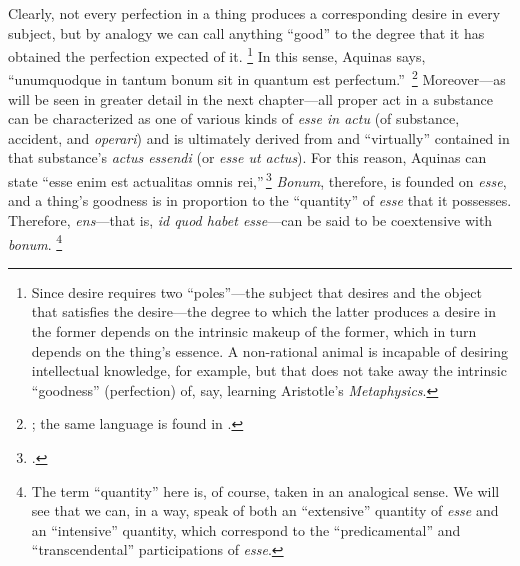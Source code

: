 %
 Clearly, not every perfection in a thing produces a corresponding desire in every subject, but by analogy we can call anything “good” to the degree that it has obtained the perfection expected of it.%
%
\footnote{Since desire requires two “poles”—the subject that desires and the object that satisfies the desire—the degree to which the latter produces a desire in the former depends on the intrinsic makeup of the former, which in turn depends on the thing’s essence. A non-rational animal is incapable of desiring intellectual knowledge, for example, but that does not take away the intrinsic “goodness” (perfection) of, say, learning Aristotle’s \emph{Metaphysics}.} In this sense, Aquinas says, “unumquodque in tantum bonum sit in quantum est perfectum.”\,%
%
\footnote{\Cite[III, cap.~24, n.~6 (Marietti n.~2051)]{st:contragent}; the same language is found in \cite[III, cap.~20, n.~2 (Marietti n.~2010)]{st:contragent}.}
%
Moreover—as will be seen in greater detail in the next chapter—all proper act in a substance can be characterized as one of various kinds of \emph{esse in actu} (of substance, accident, and \emph{operari}) and is ultimately derived from and “virtually” contained in that substance’s \emph{actus essendi} (or \emph{esse ut actus}). For this reason, Aquinas can state “esse enim est actualitas omnis rei,”\,\footcite[I, q.~5, a.~1, co.]{st:summa} \emph{Bonum}, therefore, is founded on \emph{esse}, and a thing’s goodness is in proportion to the “quantity” of \emph{esse} that it possesses.
Therefore, \emph{ens}—that is, \emph{id quod habet esse}—can be said to be coextensive with \emph{bonum}.%
%
\footnote{The term “quantity” here is, of course, taken in an analogical sense. We will see that we can, in a way, speak of both an “extensive” quantity of \emph{esse} and an “intensive” quantity, which correspond to the “predicamental” and “transcendental” participations of \emph{esse}.}
%

